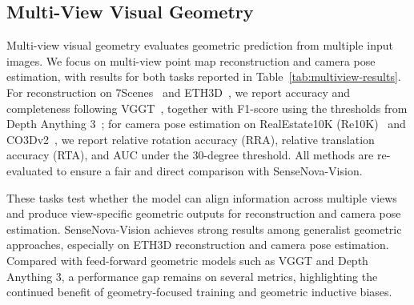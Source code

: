 \subsection{Multi-View Visual Geometry}

Multi-view visual geometry evaluates geometric prediction from multiple input images.
We focus on multi-view point map reconstruction and camera pose estimation, with results for both tasks reported in Table~\ref{tab:multiview-results}.
For reconstruction on 7Scenes~\cite{shotton2013scene} and ETH3D~\cite{schoeps2017multi}, we report accuracy and completeness following VGGT~\cite{vggt}, together with F1-score using the thresholds from Depth Anything 3~\cite{depthanything3}; for camera pose estimation on RealEstate10K (Re10K)~\cite{zhou2018stereo} and CO3Dv2~\cite{reizenstein2021commonobjects3dlargescale}, we report relative rotation accuracy (RRA), relative translation accuracy (RTA), and AUC under the 30-degree threshold.
All methods are re-evaluated to ensure a fair and direct comparison with SenseNova-Vision.

These tasks test whether the model can align information across multiple views and produce view-specific geometric outputs for reconstruction and camera pose estimation.
SenseNova-Vision achieves strong results among generalist geometric approaches, especially on ETH3D reconstruction and camera pose estimation.
Compared with feed-forward geometric models such as VGGT and Depth Anything 3, a performance gap remains on several metrics, highlighting the continued benefit of geometry-focused training and geometric inductive biases.

